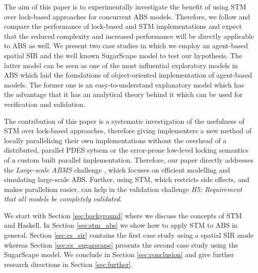 \medskip

The aim of this paper is to experimentally investigate the benefit of using STM over lock-based approaches for concurrent ABS models. Therefore, we follow \cite{discolo_lock_2006} and compare the performance of lock-based and STM implementations and expect that the reduced complexity and increased performance will be directly applicable to ABS as well. We present two case studies in which we employ an agent-based spatial SIR \cite{macal_agent-based_2010, thaler_pure_2018} and the well known SugarScape \cite{epstein_growing_1996} model to test our hypothesis. The latter model can be seen as one of the most influential exploratory models in ABS which laid the foundations of object-oriented implementation of agent-based models. The former one is an easy-to-understand explanatory model which has the advantage that it has an analytical theory behind it which can be used for verification and validation. 

The contribution of this paper is a systematic investigation of the usefulness of STM over lock-based approaches, therefore giving implementers a new method of locally parallelising their own implementations without the overhead of a distributed, parallel PDES sytsem or the error-prone low-level locking semantics of a custom built parallel implementation. Therefore, our paper directly addresses the \textit{Large-scale ABMS} challenge \cite{macal_everything_2016}, which focuses on efficient modelling and simulating large-scale ABS. Further, using STM, which restricts side effects, and makes parallelism easier, can help in the validation challenge \cite{macal_everything_2016} \emph{H5: Requirement that all models be completely validated}.

We start with Section \ref{sec:background} where we discuss the concepts of STM and Haskell. In Section \ref{sec:stm_abs} we show how to apply STM to ABS in general. Section \ref{sec:cs_sir} contains the first case study using a spatial SIR mode whereas Section \ref{sec:cs_sugarscape} presents the second case study using the SugarScape model. We conclude in Section \ref{sec:conclusion} and give further research directions in Section \ref{sec:further}.